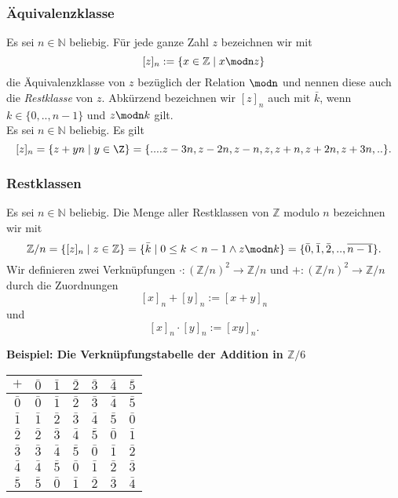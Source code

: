 \subsubsection{Äquivalenzklasse}

Es sei $n\in\mathbb{N}$ beliebig. Für jede ganze Zahl $z$ bezeichnen wir mit
\[
 [z]_n:=\{x\in\mathbb{Z}\mid x\modn z\}
\]
die Äquivalenzklasse von $z$ bezüglich der Relation $\modn$ und nennen diese auch die \textit{Restklasse} von $z$. Abkürzend bezeichnen wir $[z]_n$ auch mit $\bar k$, wenn $k\in\{0,..,n-1\}$ und $z\modn k$ gilt.
\\
Es sei $n\in\mathbb{N}$ beliebig. Es gilt
\[
 [z]_n=\{z+yn\mid y\in\Z\}=\{....z-3n,z-2n,z-n,z,z+n,z+2n,z+3n,..\}.
\]

\subsubsection{Restklassen}
 Es sei $n\in\mathbb{N}$ beliebig. Die Menge aller Restklassen von $\mathbb{Z}$ modulo $n$ bezeichnen wir mit
\[
\mathbb{Z}/n=\{[z]_n\mid z\in\mathbb{Z}\}=\{\bar k\mid 0\leq k<n-1\wedge z\modn k\}=\{\bar 0,\bar1,\bar2,..,\overline{n-1}\}.
\]
Wir definieren zwei Verknüpfungen $\cdot:(\mathbb{Z}/n)^2\rightarrow \mathbb{Z}/n$ und $+:(\mathbb{Z}/n)^2\rightarrow \mathbb{Z}/n$ durch die Zuordnungen
\[
 [x]_n+[y]_n:=[x+y]_n
\]
und
\[
 [x]_n\cdot[y]_n:=[xy]_n.
\]

\textbf{Beispiel: Die Verknüpfungstabelle der Addition in $\mathbb{Z}/6$}
\begin{center}
\begin{tabular}{|c | c | c | c | c | c | c|}
\hline
$+$ & $\bar 0$ & $\bar 1$ & $\bar 2$ &$\bar 3$ &$\bar 4$ &$\bar 5$ \\
\hline
$\bar 0$ & $\bar 0$ & $\bar 1$ & $\bar 2$ &$\bar 3$ &$\bar 4$ &$\bar 5$\\
\hline
$\bar 1$ & $\bar 1$ & $\bar 2$ &$\bar 3$ &$\bar 4$ &$\bar 5$ & $\bar 0$ \\
\hline
$\bar 2$ & $\bar 2$&$\bar 3$ &$\bar 4$ &$\bar 5$ & $\bar 0$ & $\bar 1$\\
\hline
$\bar 3$ &$\bar 3$ &$\bar 4$ &$\bar 5$ & $\bar 0$ & $\bar 1$ & $\bar 2$\\
\hline
$\bar4$ &$\bar 4$ &$\bar 5$ & $\bar 0$ & $\bar 1$ & $\bar 2$ &$\bar 3$\\
\hline
$\bar5$ &$\bar 5$ & $\bar 0$ & $\bar 1$ & $\bar 2$ &$\bar 3$ &$\bar 4$\\
\hline
\end{tabular}
\end{center}

